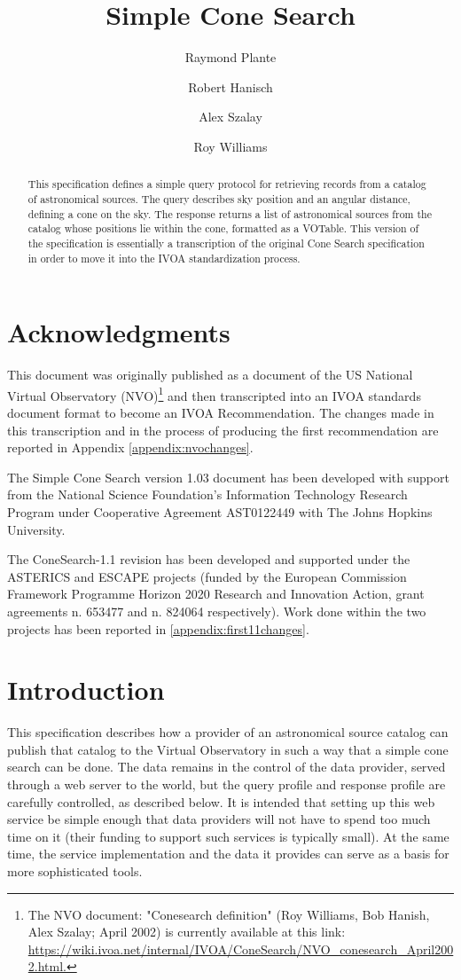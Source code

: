 \documentclass[11pt,a4paper]{ivoa}
\title{Simple Cone Search}
\author[http://www.ivoa.net/twiki/bin/view/IVOA/RayPlante]{Raymond Plante}
\author[http://www.ivoa.net/twiki/bin/view/IVOA/BobHanisch]{Robert Hanisch}
\author[http://www.ivoa.net/twiki/bin/view/IVOA/AlexSzalay]{Alex Szalay}
\author[http://www.ivoa.net/twiki/bin/view/IVOA/RoyWilliams]{Roy Williams}
\begin{document}
\begin{abstract}
This specification defines a simple query protocol for retrieving records from a catalog of astronomical sources. The query describes sky position and an angular distance, defining a cone on the sky. The response returns a list of astronomical sources from the catalog whose positions lie within the cone, formatted as a VOTable. This version of the specification is essentially a transcription of the original Cone Search specification in order to move it into the IVOA standardization process.
\end{abstract}


\section*{Acknowledgments}
This document was originally published as a document of the US National Virtual Observatory
(NVO)\footnote{The NVO document: "Conesearch definition" (Roy Williams, Bob Hanish, Alex Szalay;
April 2002) is currently available at this
link: \url{https://wiki.ivoa.net/internal/IVOA/ConeSearch/NVO\_conesearch\_April2002.html.}} 
and then transcripted
into an IVOA standards document format to become an IVOA Recommendation. The changes made in this transcription 
and in the process of producing the first recommendation are reported in Appendix \ref{appendix:nvochanges}.

The Simple Cone Search version 1.03 document has been developed with support from the National Science Foundation's
Information Technology Research Program under Cooperative Agreement AST0122449 with The Johns Hopkins University.

The ConeSearch-1.1 revision has been developed and supported under the 
ASTERICS and ESCAPE projects (funded by the European Commission Framework Programme
Horizon 2020 Research and Innovation Action, grant agreements n. 653477 and n. 824064
respectively). Work done within the two projects has been reported in \ref{appendix:first11changes}.

\section{Introduction}

This specification describes how a provider of an astronomical source catalog can publish that catalog to the Virtual Observatory in such a way that a simple cone search can be done. The data remains in the control of the data provider, served through a web server to the world, but the query profile and response profile are carefully controlled, as described below. It is intended that setting up this web service be simple enough that data providers will not have to spend too much time on it (their funding to support such services is typically small). At the same time, the service implementation and the data it provides can serve as a basis for more sophisticated tools.
\end{document}
